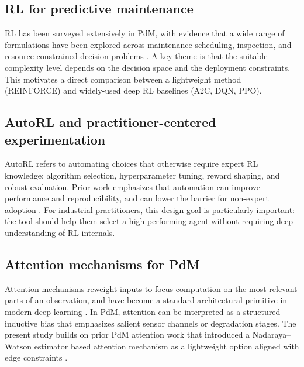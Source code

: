 \documentclass[11pt]{article}
\begin{document}
\subsection{RL for predictive maintenance}
RL has been surveyed extensively in PdM, with evidence that a wide range of formulations have been explored across maintenance scheduling, inspection, and resource-constrained decision problems \parencite{Siraskar2023RLReview}. A key theme is that the suitable complexity level depends on the decision space and the deployment constraints. This motivates a direct comparison between a lightweight method (REINFORCE) and widely-used deep RL baselines (A2C, DQN, PPO).

\subsection{AutoRL and practitioner-centered experimentation}
AutoRL refers to automating choices that otherwise require expert RL knowledge: algorithm selection, hyperparameter tuning, reward shaping, and robust evaluation. Prior work emphasizes that automation can improve performance and reproducibility, and can lower the barrier for non-expert adoption \parencite{Faust2019EvolvingRewards, Mussi2023ARLO}. For industrial practitioners, this design goal is particularly important: the tool should help them select a high-performing agent without requiring deep understanding of RL internals.

\subsection{Attention mechanisms for PdM}
Attention mechanisms reweight inputs to focus computation on the most relevant parts of an observation, and have become a standard architectural primitive in modern deep learning \parencite{Vaswani2017Attention}. In PdM, attention can be interpreted as a structured inductive bias that emphasizes salient sensor channels or degradation stages. The present study builds on prior PdM attention work that introduced a Nadaraya--Watson estimator based attention mechanism as a lightweight option aligned with edge constraints \parencite{Siraskar2024NWAttention}.
\end{document}
